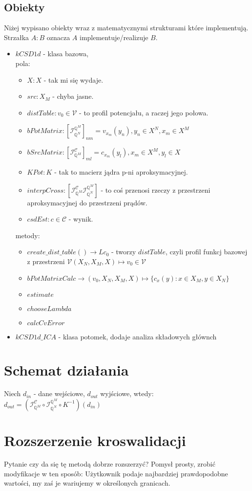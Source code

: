 \documentclass[9pt]{article}
\newcommand{\Q}{\mathbb{Q}}
\newcommand{\V}{\mathcal{V}}
\newcommand{\C}{\mathcal{C}}
\newcommand{\IC}{ \mathcal{I}_{\Q^M}^{\C}}
\newcommand{\IV}{ \mathcal{I}_{\Q^N}^{\Q^M}}
\begin{document}
\subsection{Obiekty}
Niżej wypisano obiekty wraz z matematycznymi strukturami które implementują.
Strzałka $A : B $ oznacza $A$ implementuje/realizuje $B$.
\begin{itemize}
    \item $kCSD1d$ -  klasa bazowa, \\
    pola:
    \begin{itemize}
        \item $X : X$ -  tak mi się wydaje.
        \item $src : X_M$ - chyba jasne.
        \item $distTable : v_0 \in \V$ - to profil potencjału, a raczej jego połowa.
        \item $bPotMatrix : [\IV]_{nm} = v_{x_m}(y_n), y_n\in X^N, x_m\in X^M$
        \item $bSrcMatrix : [\IC]_{ml} = c_{x_m}(y_l), x_m\in X^M, y_l\in X$ 
        \item $KPot : K$ - tak to macierz jądra p-ni aproksymacyjnej.
        \item $interpCross :[\IC \IV] $ - to coś przenosi rzeczy z przestrzeni
        aproksymacyjnej do przestrzeni prądów.
        \item $csdEst: c \in \C$ - wynik.
    \end{itemize}
    metody:
    \begin{itemize}
        \item $create\_dist\_table() \to  Lc_0$ - tworzy $distTable$, czyli profil funkcj 
        bazowej z przestrzeni $\V (X_N,X_M,X) \mapsto v_0 \in \V$
        \item $bPotMatrixCalc \to (v_0, X_N,X_M,X)\mapsto \{c_x(y):x\in X_M, y\in X_N \}$ 
        \item $estimate$
        \item $chooseLambda$
        \item $calcCvError$
    \end{itemize}
    \item $kCSD1d\_ICA$ - klasa potomek, dodaje analiza składowych głównch
\end{itemize}

\section{Schemat działania}
Niech $d_{in}$ - dane wejściowe, $d_{out}$ wyjściowe, wtedy:
$d_{out}= (\IC \circ \IV \circ K^{-1} )( d_{in})$


\section{Rozszerzenie kroswalidacji}
Pytanie czy da się tę metodą dobrze rozszerzyć?
Pomysł prosty, zrobić modyfikacje w ten sposób:
Użytkownik podaje najbardziej prawdopodobne wartości, my zaś je wariujemy w
określonych granicach.


%
%
\end{document}

